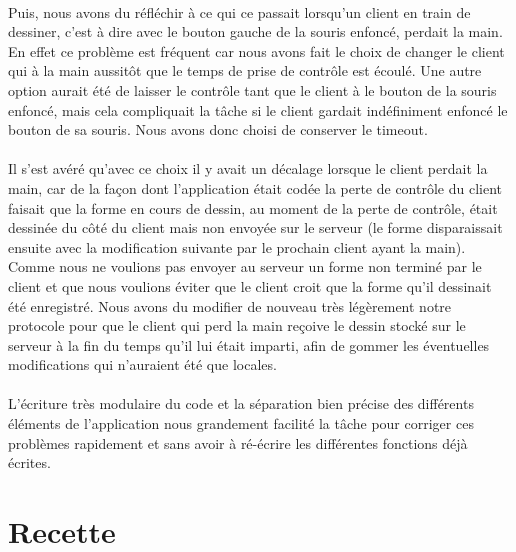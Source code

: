 \documentclass[a4paper,11pt]{article}
\begin{document}
\paragraph{} Puis, nous avons du réfléchir à ce qui ce passait lorsqu'un client en train de dessiner, c'est à dire avec le bouton gauche de la souris enfoncé, perdait la main. En effet ce problème est fréquent car nous avons fait le choix de changer le client qui à la main aussitôt que le temps de prise de contrôle est écoulé. Une autre option aurait été de laisser le contrôle tant que le client à le bouton de la souris enfoncé, mais cela compliquait la tâche si le client gardait indéfiniment enfoncé le bouton de sa souris. Nous avons donc choisi de conserver le timeout.

\paragraph{}Il s'est avéré qu'avec ce choix il y avait un décalage lorsque le client perdait la main, car de la façon dont l'application était codée la perte de contrôle du client faisait que la forme en cours de dessin, au moment de la perte de contrôle, était dessinée du côté du client mais non envoyée sur le serveur (le forme disparaissait ensuite avec la modification suivante par le prochain client ayant la main). Comme nous ne voulions pas envoyer au serveur un forme non terminé par le client et que nous voulions éviter que le client croit que la forme qu'il dessinait été enregistré. Nous avons du modifier de nouveau très légèrement notre protocole pour que le client qui perd la main reçoive le dessin stocké sur le serveur à la fin du temps qu'il lui était imparti, afin de gommer les éventuelles modifications qui n'auraient été que locales.

\paragraph{} L'écriture très modulaire du code et la séparation bien précise des différents éléments de l'application nous grandement facilité la tâche pour corriger ces problèmes rapidement et sans avoir à ré-écrire les différentes fonctions déjà écrites.

\section{Recette}
\end{document}
